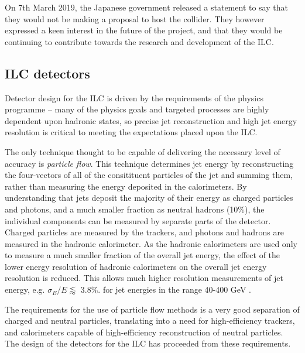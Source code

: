 On 7th March 2019, the Japanese government released a statement to say that they would not be making a proposal to host the collider\cite{japan-ilc-decision}. They however expressed a keen interest in the future of the project, and that they would be continuing to contribute towards the research and development of the \acrshort{ILC}.

\subsection{ILC detectors}
\label{section:ILC-detectors}
Detector design for the \acrshort{ILC} is driven by the requirements of the physics programme -- many of the physics goals and targeted processes are highly dependent upon hadronic states, so precise jet reconstruction and high jet energy resolution is critical to meeting the expectations placed upon the \acrshort{ILC}. 

The only technique thought to be capable of delivering the necessary level of accuracy is \textit{particle flow}. This technique determines jet energy by reconstructing the four-vectors of all of the consitituent particles of the jet and summing them, rather than measuring the energy deposited in the calorimeters. By understanding that jets deposit the majority of their energy as charged particles and photons, and a much smaller fraction as neutral hadrons (10\%), the individual components can be measured by separate parts of the detector. Charged particles are measured by the trackers, and photons and hadrons are measured in the hadronic calorimeter. As the hadronic calorimeters are used only to measure a much smaller fraction of the overall jet energy, the effect of the lower energy resolution of hadronic calorimeters on the overall jet energy resolution is reduced. This allows much higher resolution measurements of jet energy, e.g. $\sigma_E / E \lessapprox$ 3.8\%. for jet energies in the range 40-400 GeV \cite{particle-flow-algorithms} .

The requirements for the use of particle flow methods is a very good separation of charged and neutral particles, translating into a need for high-efficiency trackers, and calorimeters capable of high-efficiency reconstruction of neutral particles. The design of the detectors for the \acrshort{ILC} has proceeded from these requirements.

